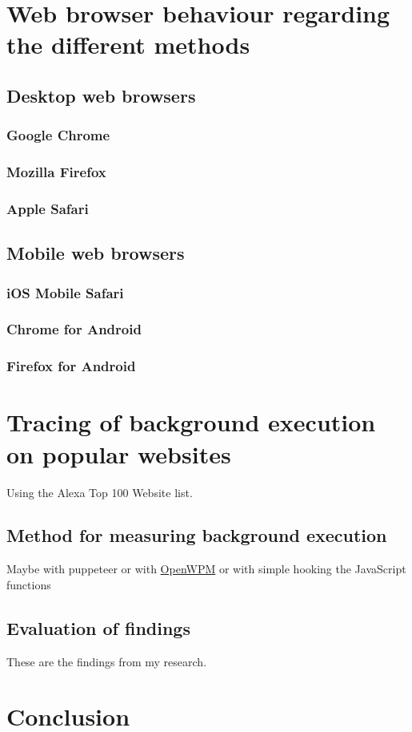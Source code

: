 \documentclass[article,type=bsc,colorback,accentcolor=tud9c]{tudthesis}
\begin{document}
  \section{Web browser behaviour regarding the different methods}

  \subsection{Desktop web browsers}

  \subsubsection{Google Chrome}

  \subsubsection{Mozilla Firefox}

  \subsubsection{Apple Safari}

  \subsection{Mobile web browsers}

  \subsubsection{iOS Mobile Safari}

  \subsubsection{Chrome for Android}

  \subsubsection{Firefox for Android}
  
  \section{Tracing of background execution on popular websites}

  Using the Alexa Top 100 Website list.
  
  \subsection{Method for measuring background execution}

  Maybe with puppeteer or with \href{https://github.com/mozilla/OpenWPM}{OpenWPM} or with simple hooking the JavaScript functions
  
  \subsection{Evaluation of findings}

  These are the findings from my research.

  \section{Conclusion}

  

  

   
\end{document}
